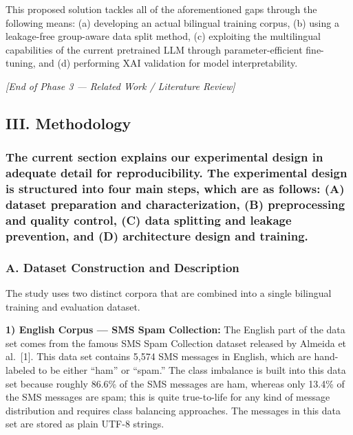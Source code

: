 This proposed solution tackles all of the aforementioned gaps through
the following means: (a) developing an actual bilingual training corpus,
(b) using a leakage-free group-aware data split method, (c) exploiting
the multilingual capabilities of the current pretrained LLM through
parameter-efficient fine-tuning, and (d) performing XAI validation for
model interpretability.

\emph{{[}End of Phase 3 --- Related Work / Literature Review{]}}

\subsection{III. Methodology}\label{iii.-methodology}

\subsubsection{The current section explains our experimental design in
adequate detail for reproducibility. The experimental design is
structured into four main steps, which are as follows: (A) dataset
preparation and characterization, (B) preprocessing and quality control,
(C) data splitting and leakage prevention, and (D) architecture design
and
training.}\label{the-current-section-explains-our-experimental-design-in-adequate-detail-for-reproducibility.-the-experimental-design-is-structured-into-four-main-steps-which-are-as-follows-a-dataset-preparation-and-characterization-b-preprocessing-and-quality-control-c-data-splitting-and-leakage-prevention-and-d-architecture-design-and-training.}

\subsubsection{A. Dataset Construction and
Description}\label{a.-dataset-construction-and-description}

The study uses two distinct corpora that are combined into a single
bilingual training and evaluation dataset.

\textbf{1) English Corpus --- SMS Spam Collection:} The English part of
the data set comes from the famous SMS Spam Collection dataset released
by Almeida et al.~{[}1{]}. This data set contains 5,574 SMS messages in
English, which are hand-labeled to be either ``ham'' or ``spam.'' The
class imbalance is built into this data set because roughly 86.6\% of
the SMS messages are ham, whereas only 13.4\% of the SMS messages are
spam; this is quite true-to-life for any kind of message distribution
and requires class balancing approaches. The messages in this data set
are stored as plain UTF-8 strings.

